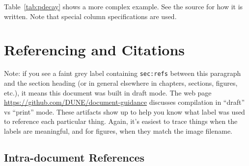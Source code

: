Table~\ref{tab:pdecay} shows a more complex example.
See the source for how it is written.
Note that special column specifications are used.


\FloatBarrier

\section{Referencing and Citations}
\label{sec:refs}

Note: if you see a faint grey label containing \texttt{sec:refs}
between this paragraph and the section heading (or in general
elsewhere in chapters, sections, figures, etc.), it means this document
was built in draft mode.  The web page \url{https://github.com/DUNE/document-guidance} discusses
compilation in ``draft'' vs ``print'' mode.
These artifacts show up to help you know what label was used to
reference each particular thing.  Again, it's easiest to trace things when the labels are meaningful, and for figures, when they match the image filename.


\subsection{Intra-document References}

